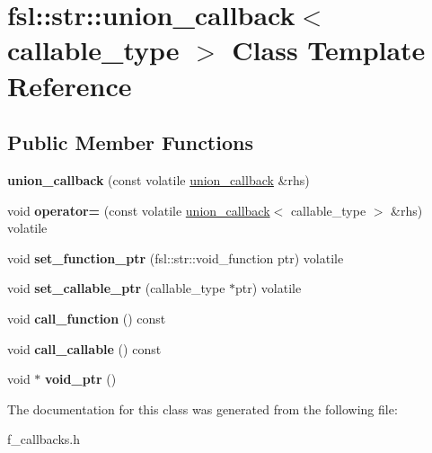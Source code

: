 \hypertarget{classfsl_1_1str_1_1union__callback}{}\section{fsl\+::str\+::union\+\_\+callback$<$ callable\+\_\+type $>$ Class Template Reference}
\label{classfsl_1_1str_1_1union__callback}
\subsection*{Public Member Functions}
\begin{DoxyCompactItemize}
\item 
\mbox{\label{classfsl_1_1str_1_1union__callback_acc70ee5154f129c862fa06d853903a7d}} 
{\bfseries union\+\_\+callback} (const volatile \mbox{\hyperlink{classfsl_1_1str_1_1union__callback}{union\+\_\+callback}} \&rhs)
\item 
\mbox{\label{classfsl_1_1str_1_1union__callback_a5d06f14983507f3dbc3e654978159747}} 
void {\bfseries operator=} (const volatile \mbox{\hyperlink{classfsl_1_1str_1_1union__callback}{union\+\_\+callback}}$<$ callable\+\_\+type $>$ \&rhs) volatile
\item 
\mbox{\label{classfsl_1_1str_1_1union__callback_ac5e9b27400901daf8f8c1f1e3872e85c}} 
void {\bfseries set\+\_\+function\+\_\+ptr} (fsl\+::str\+::void\+\_\+function ptr) volatile
\item 
\mbox{\label{classfsl_1_1str_1_1union__callback_a0c11635e79ad1fb25fe6644bc5e292b7}} 
void {\bfseries set\+\_\+callable\+\_\+ptr} (callable\+\_\+type $\ast$ptr) volatile
\item 
\mbox{\label{classfsl_1_1str_1_1union__callback_afdb047867c1564632dee549b27f1a37a}} 
void {\bfseries call\+\_\+function} () const
\item 
\mbox{\label{classfsl_1_1str_1_1union__callback_adae9c2903ee403d685b05dc0b7913f78}} 
void {\bfseries call\+\_\+callable} () const
\item 
\mbox{\label{classfsl_1_1str_1_1union__callback_a61b0f50e3cdf6248b538e0b5882e503e}} 
void $\ast$ {\bfseries void\+\_\+ptr} ()
\end{DoxyCompactItemize}


The documentation for this class was generated from the following file\+:\begin{DoxyCompactItemize}
\item 
f\+\_\+callbacks.\+h\end{DoxyCompactItemize}
